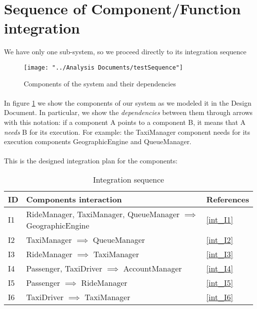 \section{Sequence of Component/Function integration}
We have only one sub-system, so we proceed directly to its integration sequence
\begin{figure}[H]
	\centering
	\texttt{[image: "../Analysis Documents/testSequence"]}
	\caption{Components of the system and their dependencies}
	\label{fig:components}
\end{figure}
\paragraph{}In figure \ref{fig:components} we show the components of our system as we modeled it in the Design Document. In particular, we show the \textit{dependencies} between them through arrows with this notation: if a component A points to a component B, it means that A \textit{needs} B for its execution. For example: the TaxiManager component needs for its execution components GeographicEngine and QueueManager.

\paragraph{} This is the designed integration plan for the components:
\begin{table}[H]
\centering
	\begin{tabular}{ l | l | l }
	\textbf{ID} & \textbf{Components interaction} & References \\ \hline
	I1 \label{I1} & RideManager, TaxiManager, QueueManager $\implies$ GeographicEngine & \ref{int_I1} \\ \hline
	I2 \label{I2} & TaxiManager $\implies$ QueueManager & \ref{int_I2} \\ \hline
	I3 \label{I3} & RideManager $\implies$ TaxiManager & \ref{int_I3}\\ \hline
	I4 \label{I4} & Passenger, TaxiDriver $\implies$ AccountManager & \ref{int_I4}\\ \hline
	I5 \label{I5} & Passenger $\implies$ RideManager & \ref{int_I5}\\ \hline
	I6 \label{I6} & TaxiDriver $\implies$ TaxiManager & \ref{int_I6}\\
	\end{tabular}
	\caption{Integration sequence}
\end{table}
%
%
